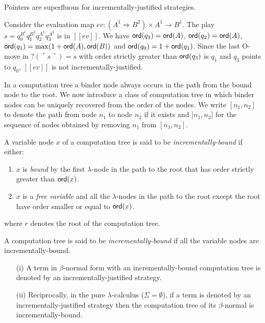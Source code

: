 \documentclass{llncs}
\newcommand\ord[1]{{\sf ord}(#1)}
\newcommand{\lsem}{[\![} %
\newcommand{\rsem}{]\!]} %
\newcommand{\sem}[1]{{\lsem #1 \rsem}}
\newcommand{\pview}[1]{\ulcorner #1 \urcorner}
\begin{document}
\begin{lemma}
\label{lem:incrjustified_pointers_uniqu_recover} Pointers are
superfluous for incrementally-justified strategies.
\end{lemma}

\begin{example}
Consider the evaluation map $ev : (A^1 \Rightarrow B^2) \times  A^1 \rightarrow B^1$. 
The play $s = q_0^{B^1} q_1^{B^2} q_2^{A^1} q_3^{A^2}$ is in $\sem{ev}$. We have $\ord{q_3} = \ord{A}$,
$\ord{q_2} = \ord{A}$, $\ord{q_1} = \max( 1+\ord{A}, \ord{B})$ and
$\ord{q_0} = 1 + \ord{q_1}$. Since the last O-move in $?(\pview{s})= s$
with order strictly greater than $\ord{q_3}$ is $q_1$ and $q_3$ points to $q_0$, $\sem{ev}$ is not incrementally-justified.
\end{example}


In a computation tree a binder node always occurs in the path from
the bound node to the root. We now introduce a class of computation
tree in which binder nodes can be uniquely recovered from the order
of the nodes. We write $[n_1,n_2]$ to denote the path from node
$n_1$ to node $n_2$ if it exists and $]n_1,n_2]$ for the sequence of
nodes obtained by removing $n_1$ from $[n_1,n_2]$.

\begin{definition}
A variable node $x$ of a computation tree is said to be
\emph{incrementally-bound} if either:
\begin{enumerate}
\item $x$ is \emph{bound} by the first $\lambda$-node in the path to the root that has
order strictly greater than $\ord{x}$.
\item $x$ is a \emph{free variable} and all the $\lambda$-nodes in the path to the root except the root have order
smaller or equal to $\ord{x}$.
\end{enumerate}
where $r$ denotes the root of the computation tree.

A computation tree is said to be \emph{incrementally-bound} if all
the variable nodes are incrementally-bound.
\end{definition}

\begin{proposition}
\label{prop:incrbound_imp_incrjustified}
\begin{enumerate}
\item[(i)] A term in $\beta$-normal form with an incrementally-bound computation tree is denoted by an incrementally-justified strategy.
\item[(ii)] Reciprocally, in the pure $\lambda$-calculus ($\Sigma=\emptyset$), if a term is denoted by an incrementally-justified strategy then the computation tree of its $\beta$-normal is incrementally-bound.
\end{enumerate}
\end{proposition}
\end{document}
